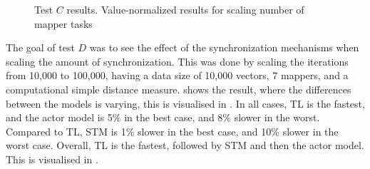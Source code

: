 \begin{figure}[h]
\centering
\dataset
{}
\caption{Test $C$ results. Value-normalized results for scaling number of mapper tasks}\label{fig:value_norm_testc}
\end{figure}
%
The goal of test $D$ was to see the effect of the synchronization mechanisms when scaling the amount of synchronization. This was done by scaling the iterations from 10,000 to 100,000, having a data size of 10,000 vectors, 7 mappers, and a computational simple distance measure.  shows the result, where the differences between the models is varying, this is visualised in . In all cases, \ac{TL} is the fastest, and the actor model is  5\% in the best case, and 8\% slower in the worst. Compared to \ac{TL}, \ac{STM} is 1\% slower in the best case, and 10\% slower in the worst case. Overall, \ac{TL} is the fastest, followed by \ac{STM} and then the actor model. This is visualised in .%
